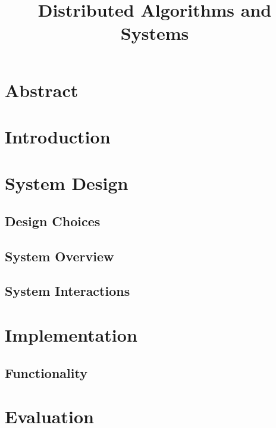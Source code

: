 \documentclass{article}
\title{Distributed Algorithms and Systems}
\begin{document}
\maketitle

\section{Abstract}

\section{Introduction}

\section{System Design}

\subsection{Design Choices}
\subsection{System Overview}
\subsection{System Interactions}

\section{Implementation}
\subsection{Functionality}

\section{Evaluation}
\end{document}

